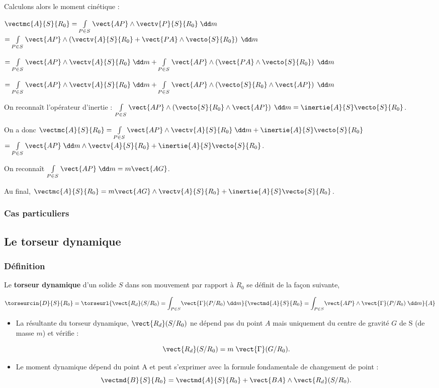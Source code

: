 Calculons alors le moment cinétique : 

$\vectmc{A}{S}{R_0}=\int\limits_{P\in S}\vect{AP}\wedge \vectv{P}{S}{R_0}\; \dd m$
$=\int\limits_{P\in S}\vect{AP}\wedge \left( \vectv{A}{S}{R_0} + \vect{PA}\wedge \vecto{S}{R_0} \right)\; \dd m$

$=\int\limits_{P\in S}\vect{AP}\wedge  \vectv{A}{S}{R_0} \; \dd m
+\int\limits_{P\in S}\vect{AP}\wedge \left(  \vect{PA}\wedge \vecto{S}{R_0} \right)\; \dd m$

$=\int\limits_{P\in S}\vect{AP}\wedge  \vectv{A}{S}{R_0} \; \dd m
+\int\limits_{P\in S}\vect{AP}\wedge \left(   \vecto{S}{R_0} \wedge\vect{AP} \right)\; \dd m$


On reconnaît l'opérateur d'inertie : $\int\limits_{P\in S}\vect{AP}\wedge \left(   \vecto{S}{R_0} \wedge\vect{AP} \right)\; \dd m = \inertie{A}{S}\vecto{S}{R_0}$.

On a donc
$\vectmc{A}{S}{R_0}=\int\limits_{P\in S}\vect{AP}\wedge  \vectv{A}{S}{R_0} \; \dd m +\inertie{A}{S}\vecto{S}{R_0}$
$=\int\limits_{P\in S}\vect{AP} \; \dd m  \wedge  \vectv{A}{S}{R_0} +\inertie{A}{S}\vecto{S}{R_0}$.

On reconnaît $\int\limits_{P\in S}\vect{AP} \; \dd m = m \vect{AG}$.

Au final, 
$\vectmc{A}{S}{R_0}=m \vect{AG}  \wedge  \vectv{A}{S}{R_0} +\inertie{A}{S}\vecto{S}{R_0}$.

\subsubsection{Cas particuliers}

\subsection{Le torseur dynamique}
\subsubsection{Définition}
\begin{defi}
Le \textbf{torseur dynamique} d'un solide $S$ dans son mouvement par rapport à $R_0$ se définit de la façon suivante,

$$
\torseurcin{D}{S}{R_0}=\torseurl{\vect{R_d}(S/R_0)=\displaystyle{\int_{P\in S}}\vect{\Gamma}(P/R_0)\;\dd m}{\vectmd{A}{S}{R_0}=\displaystyle{\int_{P\in S}}\vect{AP}\wedge \vect{\Gamma}(P/R_0)\;\dd m}{A}
$$

\begin{itemize}
\item La résultante du torseur dynamique, $\vect{R_d}(S/R_0)$ ne dépend pas du point $A$ mais uniquement du centre de gravité $G$ de S (de masse $m$) et vérifie :

$$\vect{R_d}(S/R_0)=m\;\vect{\Gamma}(G/R_0).
$$
\item Le moment dynamique dépend du point A et peut s'exprimer avec la formule fondamentale de changement de point :
$$
\vectmd{B}{S}{R_0}=\vectmd{A}{S}{R_0}+\vect{BA}\wedge \vect{R_d}(S/R_0).
$$
\end{itemize}
\end{defi}

